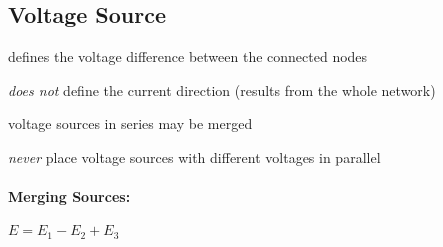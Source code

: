 
\subsection{Voltage Source} %
	
	\begin{tightitemize}
		\item defines the voltage difference between the connected nodes
		\item \emph{does not} define the current direction (results from the whole network)
		\item voltage sources in series may be merged
		\item \emph{never} place voltage sources with different voltages in parallel
	\end{tightitemize}
	
	\paragraph{Merging Sources:} %
		
		$E = E_1 - E_2 + E_3$
		
	
